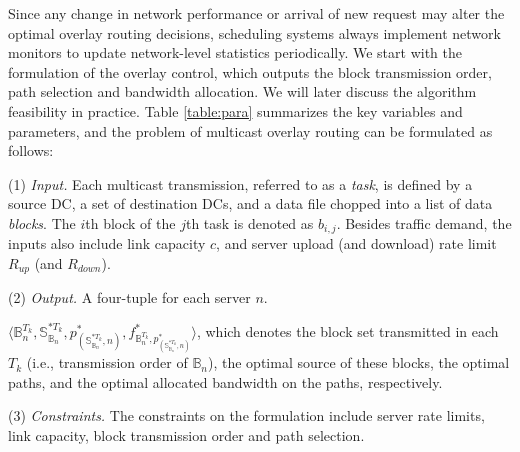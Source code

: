 Since any change in network performance or arrival of
new request may alter the optimal overlay
routing decisions, scheduling systems always implement network monitors to update network-level statistics periodically. We start with the formulation of the overlay control, which outputs the block transmission order, path selection and bandwidth allocation. We will later discuss the algorithm feasibility in practice.
Table \ref{table:para} summarizes the key variables and parameters, and the problem of multicast overlay routing can be formulated as follows:


\noindent(1) {\em Input.} %
Each multicast transmission, referred to as a {\em task}, is defined
by a source DC, a set of destination DCs, and a data file chopped into
a list of data {\em blocks}. 
The $i$th block of the $j$th task is denoted as $b_{i,j}$. Besides traffic demand, the inputs also include link capacity $c$, and
server upload (and download) rate limit $R_{up}$ (and $R_{down}$).

\noindent(2) {\em Output.} A four-tuple for each server $n$.

$\langle \mathbb{B}^{T_k}_n, \mathbb{S}_{\mathbb{B}_n}^{*T_k}, p^*_{(\mathbb{S}_{\mathbb{B}_n}^{*T_k},n)}, f^*_{\mathbb{B}^{T_k}_n,p^*_{(\mathbb{S}_{\mathbb{B}_n}^{*T_k},n)}} \rangle$, which denotes the block set transmitted in each $T_k$ (i.e., transmission order of $\mathbb{B}_n$), the optimal source of these blocks, the optimal paths, and the optimal allocated bandwidth on the paths, respectively.

\noindent(3) {\em Constraints.}
The constraints on the formulation include server rate limits, link capacity, block transmission order and path selection.

